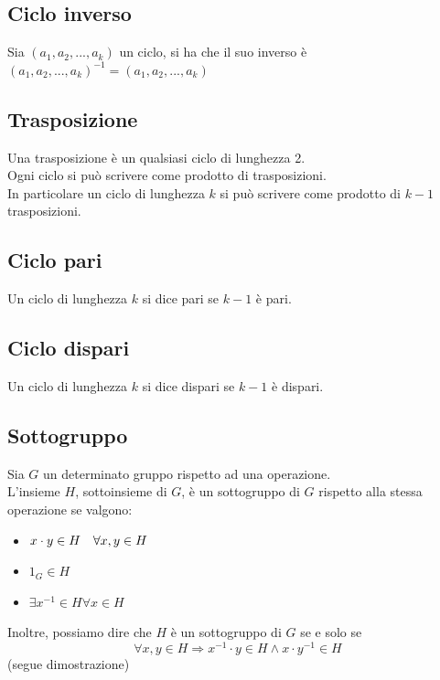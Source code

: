 \begin{flushleft}
\subsection{Ciclo inverso}
Sia $(a_1,a_2,...,a_k)$ un ciclo, si ha che il suo inverso è $(a_1,a_2,...,a_k)^{-1} = (a_1,a_2,...,a_k)$

\subsection{Trasposizione}
Una trasposizione è un qualsiasi ciclo di lunghezza 2.\\
Ogni ciclo si può scrivere come prodotto di trasposizioni.\\
In particolare un ciclo di lunghezza $k$ si può scrivere come prodotto di $k-1$ trasposizioni.

\subsection{Ciclo pari}
Un ciclo di lunghezza $k$ si dice pari se $k-1$ è pari.

\subsection{Ciclo dispari}
Un ciclo di lunghezza $k$ si dice dispari se $k-1$ è dispari.

\subsection{Sottogruppo}
Sia $G$ un determinato gruppo rispetto ad una operazione.\\
L'insieme $H$, sottoinsieme di $G$, è un sottogruppo di $G$ rispetto alla stessa operazione se valgono:
\begin{itemize}
    \item $x\cdot y \in H\hspace{10px}\forall x,y\in H$
    \item $1_G \in H$
    \item $\exists x^{-1}\in H \forall x \in H$
\end{itemize}
Inoltre, possiamo dire che $H$ è un sottogruppo di $G$ se e solo se
\[\forall x,y\in H \Rightarrow x^{-1}\cdot y \in H \land x\cdot y^{-1} \in H\]
(segue dimostrazione)
\\ \vspace{300px}



\end{flushleft}
